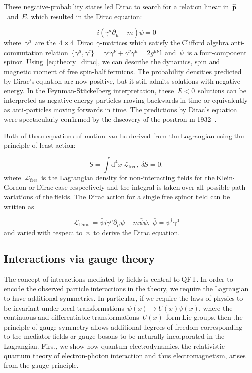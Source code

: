 These negative-probability states led Dirac to search for a relation linear in~$\hat{\mathbf{p}}$~and~$E$, which resulted in the Dirac equation:

\begin{equation}
\label{eq:theory_dirac}
i (\gamma^\mu \partial_\mu - m) \psi = 0
\end{equation}
where~$\gamma^\mu$~are the~$4\times4$~Dirac~$\gamma$-matrices which satisfy the Clifford algebra anti-commutation relation~$\{ \gamma^\mu, \gamma^\nu \} = \gamma^\mu \gamma^\nu + \gamma^\nu \gamma^\mu = 2 g^{\mu\nu} \mathbb{I}$~and~$\psi$~is a four-component spinor. Using~\cref{eq:theory_dirac}, we can describe the dynamics, spin and magnetic moment of free spin-half fermions. The probability densities predicted by Dirac's equation are now positive, but it still admits solutions with negative energy. In the Feynman-Stückelberg interpretation, these~$E<0$~solutions can be interpreted as negative-energy particles moving backwards in time or equivalently as anti-particles moving forwards in time. The predictions by Dirac's equation were spectacularly confirmed by the discovery of the positron in 1932~\cite{anderson1933positive}.

Both of these equations of motion can be derived from the Lagrangian using the principle of least action:

\begin{equation}
\label{eq:theory_action}
S = \int \mathrm{d}^4x\ \mathcal{L}_{\mathrm{free}},\ \delta S = 0,
\end{equation}
where~$\mathcal{L}_{\mathrm{free}}$~is the Lagrangian density for non-interacting fields for the Klein-Gordon or Dirac case respectively and the integral is taken over all possible path variations of the fields. The Dirac action for a single free spinor field can be written as

\begin{equation}
\label{eq:theory_kg_lagrangian}
\mathcal{L}_{\mathrm{Dirac}} = \bar{\psi} i \gamma^\mu \partial_\mu \psi - m \bar{\psi} \psi,\ \bar{\psi} = \psi^\dagger \gamma^0
\end{equation}
and varied with respect to~$\psi$~to derive the Dirac equation.

\subsection{Interactions via gauge theory}
The concept of interactions mediated by fields is central to QFT. In order to encode the observed particle interactions in the theory, we require the Lagrangian to have additional symmetries. In particular, if we require the laws of physics to be invariant under local transformations~$\psi(x) \rightarrow U(x) \psi(x)$, where the continuous and differentiable transformations~$U(x)$~form Lie groups, then the principle of gauge symmetry allows additional degrees of freedom corresponding to the mediator fields or gauge bosons to be naturally incorporated in the Lagrangian. First, we show how quantum electrodynamics, the relativistic quantum theory of electron-photon interaction and thus electromagnetism, arises from the gauge principle.

